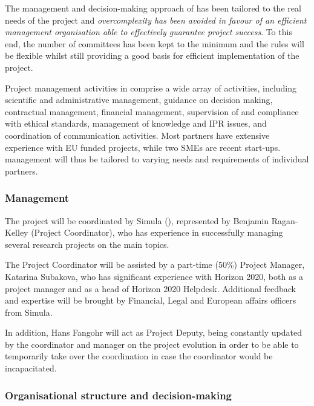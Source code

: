 \label{sect:mgt}

The management and decision-making approach of \TheProject has been
tailored to the real needs of the project and \emph{overcomplexity has been avoided
in favour of an efficient management organisation able to effectively guarantee
project success}. To this end, the number of committees has been kept to
the minimum and the rules will be flexible whilst still providing a good basis
for efficient implementation of the project.

Project management activities in \TheProject comprise a wide array
of activities, including scientific and administrative management,
guidance on decision making, contractual management, financial
management, supervision of and compliance with ethical standards,
management of knowledge and IPR issues, and coordination of
communication activities. Most partners have extensive experience
with EU funded projects, while two SMEs are  recent start-ups.
\TheProject management will thus be tailored to varying needs and
requirements of individual partners.

\subsubsection{Management}

The project will be coordinated by Simula (),
represented by Benjamin Ragan-Kelley (Project Coordinator), who has
experience in successfully managing several research projects on the
main \TheProject topics. 

The Project Coordinator will be assisted by a part-time (50\%) Project
Manager, Katarina Subakova, who has significant experience with Horizon 2020, both
as a project manager and as a head of Horizon 2020 Helpdesk.
Additional feedback and expertise will be brought by Financial, Legal
and European affairs officers from Simula. 

In addition, Hans Fangohr will act as Project Deputy, being constantly
updated by the coordinator and manager on the project evolution in
order to be able to temporarily take over the coordination in case the
coordinator would be incapacitated.

\subsubsection{Organisational structure and decision-making}

